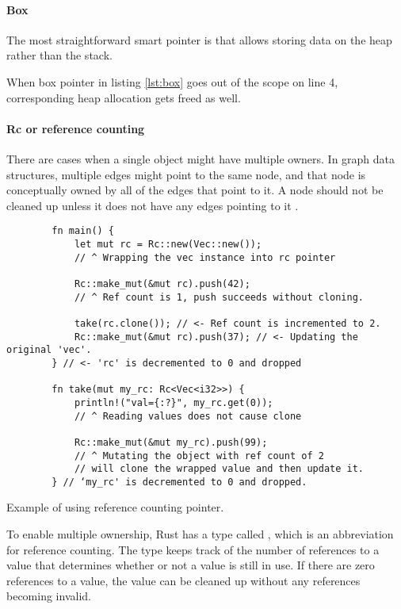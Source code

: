 \paragraph{Box}
The most straightforward smart pointer is  that allows storing data on the heap rather than the stack.

When box pointer in listing \ref{lst:box} goes out of the scope on line 4, corresponding heap allocation gets freed as well.

\paragraph{Rc or reference counting}
There are cases when a single object might have multiple owners. In graph data structures, multiple edges might point to the same node, and that node is conceptually owned by all of the edges that point to it. A node should not be cleaned up unless it does not have any edges pointing to it \cite{rust-book-2e}.

\begin{listing}[!ht]

    \centering
    \begin{verbatim}
        fn main() {
            let mut rc = Rc::new(Vec::new());
            // ^ Wrapping the vec instance into rc pointer

            Rc::make_mut(&mut rc).push(42);
            // ^ Ref count is 1, push succeeds without cloning.

            take(rc.clone()); // <- Ref count is incremented to 2.
            Rc::make_mut(&mut rc).push(37); // <- Updating the original 'vec'.
        } // <- 'rc' is decremented to 0 and dropped

        fn take(mut my_rc: Rc<Vec<i32>>) {
            println!("val={:?}", my_rc.get(0));
            // ^ Reading values does not cause clone

            Rc::make_mut(&mut my_rc).push(99);
            // ^ Mutating the object with ref count of 2
            // will clone the wrapped value and then update it.
        } // ‘my_rc' is decremented to 0 and dropped.
    \end{verbatim}

    \caption{Example of using reference counting pointer.}
    \label{lst:rc}
\end{listing}

To enable multiple ownership, Rust has a type called , which is an abbreviation for reference counting. The  type keeps track of the number of references to a value that determines whether or not a value is still in use. If there are zero references to a value, the value can be cleaned up without any references becoming invalid.

